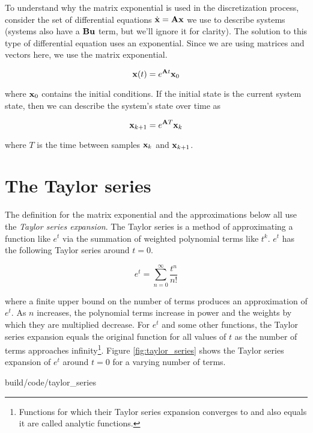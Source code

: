 To understand why the matrix exponential is used in the \gls{discretization}
process, consider the set of differential equations
$\dot{\mathbf{x}} = \mathbf{A}\mathbf{x}$ we use to describe \glspl{system}
(\glspl{system} also have a $\mathbf{B}\mathbf{u}$ term, but we'll ignore it for
clarity). The solution to this type of differential equation uses an
exponential. Since we are using matrices and vectors here, we use the matrix
exponential.

\begin{equation*}
  \mathbf{x}(t) = e^{\mathbf{A}t} \mathbf{x}_0
\end{equation*}

where $\mathbf{x}_0$ contains the initial conditions. If the initial \gls{state} is
the current system \gls{state}, then we can describe the \gls{system}'s
\gls{state} over time as

\begin{equation*}
  \mathbf{x}_{k+1} = e^{\mathbf{A}T} \mathbf{x}_k
\end{equation*}

where $T$ is the time between samples $\mathbf{x}_k$ and $\mathbf{x}_{k+1}$.

\section{The Taylor series}
The definition for the matrix exponential and the approximations below all use
the \textit{Taylor series expansion}. The Taylor series is a method of
approximating a function like $e^t$ via the summation of weighted polynomial
terms like $t^k$. $e^t$ has the following Taylor series around $t = 0$.

\begin{equation*}
  e^t = \sum_{n = 0}^\infty \frac{t^n}{n!}
\end{equation*}

where a finite upper bound on the number of terms produces an approximation of
$e^t$. As $n$ increases, the polynomial terms increase in power and the weights
by which they are multiplied decrease. For $e^t$ and some other functions, the
Taylor series expansion equals the original function for all values of $t$ as
the number of terms approaches infinity\footnote{Functions for which their
Taylor series expansion converges to and also equals it are called analytic
functions.}. Figure \ref{fig:taylor_series} shows the Taylor series expansion of
$e^t$ around $t = 0$ for a varying number of terms.

\begin{svg}{build/code/taylor_series}
  \caption{Taylor series expansions of $e^t$ around $t = 0$ for $n$ terms}
  \label{fig:taylor_series}
\end{svg}

